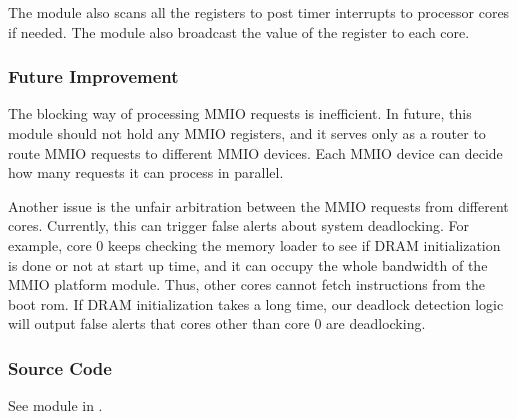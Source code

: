 The module also scans all the  registers to post timer interrupts to  processor cores if needed.
The module also broadcast the value of the  register to each core.

\subsubsection{Future Improvement}
The blocking way of processing MMIO requests is inefficient.
In future, this module should not hold any MMIO registers, and it serves only as a router to route MMIO requests to different MMIO devices.
Each MMIO device can decide how many requests it can process in parallel.

Another issue is the unfair arbitration between the MMIO requests from different cores.
Currently, this can trigger false alerts about system deadlocking.
For example, core 0  keeps checking the memory loader to see if DRAM initialization is done or not at start up time, and it can occupy the whole bandwidth of the MMIO platform module.
Thus, other cores cannot fetch instructions from the boot rom.
If DRAM initialization takes a long time, our deadlock detection logic will output false alerts that cores other than core 0 are deadlocking.

\subsubsection{Source Code}
See module  in .
